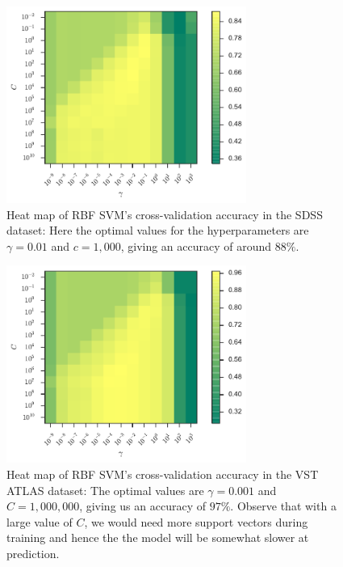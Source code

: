 \begin{figure}[p]
	\centering
	\includegraphics[width=0.7\textwidth]{figures/4_expt1/sdss_grid_rbf}
	\caption[Heat map of RBF SVM's CV accuracy in SDSS]{
		Heat map of RBF SVM's cross-validation accuracy in the SDSS dataset:
		Here the optimal values for the hyperparameters are $\gamma=0.01$
		and $c = 1,000$, giving an accuracy of around $88\%$.}
	\label{fig:sdss_grid_rbf}
\end{figure}

\begin{figure}[p]
	\centering
	\includegraphics[width=0.7\textwidth]{figures/4_expt1/vstatlas_grid_rbf}
	\caption[Heat map of RBF SVM's CV accuracy in VST ATLAS]{
		Heat map of RBF SVM's cross-validation accuracy in the VST ATLAS dataset:
		The optimal values are $\gamma=0.001$ and $C = 1,000,000$, giving us an accuracy
		of $97\%$. Observe that
		with a large value of $C$, we would need more support vectors during training
		and hence the the model will be somewhat slower at prediction.}
	\label{fig:vstatlas_grid_rbf}
\end{figure}


